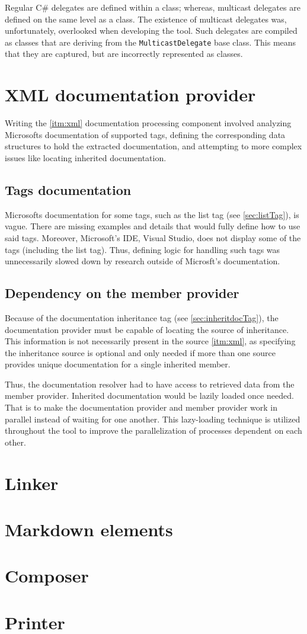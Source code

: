 Regular C\# delegates are defined within a class; whereas, multicast delegates are defined on the same level as a class.
The existence of multicast delegates was, unfortunately, overlooked when developing the tool.
Such delegates are compiled as classes that are deriving from the \lstinline[language=csh]{MulticastDelegate} base class.
This means that they are captured, but are incorrectly represented as classes.

\section{XML documentation provider}

Writing the \ref{itm:xml} documentation processing component involved analyzing Microsofts documentation of supported tags, defining the corresponding data structures to hold the extracted documentation, and attempting to more complex issues like locating inherited documentation.

\subsection{Tags documentation}

Microsofts documentation for some tags, such as the list tag (see \ref{sec:listTag}), is vague. There are missing examples and details that would fully define how to use said tags. Moreover, Microsoft's IDE, Visual Studio, does not display some of the tags (including the list tag). Thus, defining logic for handling such tags was unnecessarily slowed down by research outside of Microsft's documentation.

\subsection{Dependency on the member provider}

Because of the documentation inheritance tag (see \ref{sec:inheritdocTag}), the documentation provider must be capable of locating the source of inheritance. This information is not necessarily present in the source \ref{itm:xml}, as specifying the inheritance source is optional and only needed if more than one source provides unique documentation for a single inherited member.

Thus, the documentation resolver had to have access to retrieved data from the member provider. Inherited documentation would be lazily loaded once needed. That is to make the documentation provider and member provider work in parallel instead of waiting for one another. This lazy-loading technique is utilized throughout the tool to improve the parallelization of processes dependent on each other.

\section{Linker}

\section{Markdown elements}

\section{Composer}

\section{Printer}